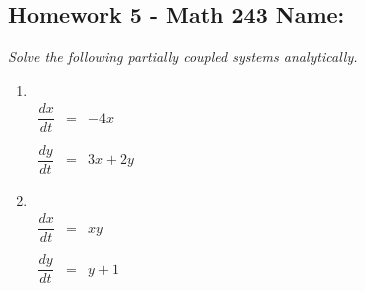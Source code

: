 \documentclass[10pt]{article}
\begin{document}
\pagestyle{empty}
\subsection*{Homework 5 - Math 243 \hfill Name: \underline{\hspace*{2in}}}


\noindent


\noindent
\textit{Solve the following partially coupled systems analytically.}

\begin{multicols}{2}
\begin{enumerate}
\setcounter{enumi}{\theenumCount}
\item ~ \\ $\begin{array}{rcl} \dfrac{dx}{dt} & = & -4 x \\ ~ & & \\ \dfrac{dy}{dt} & = & 3x + 2y  \end{array}$


\item ~ \\ $\begin{array}{rcl} \dfrac{dx}{dt} & = & x y \\ ~ & & \\ \dfrac{dy}{dt} & = & y + 1  \end{array}$

\setcounter{enumCount}{\theenumi}
\end{enumerate} 
\end{multicols}
\vfill
\end{document}

